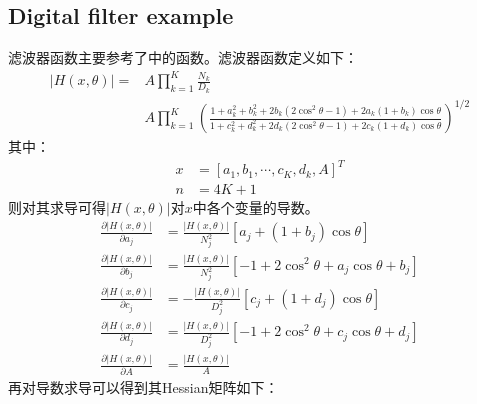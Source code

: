 \documentclass{ctexart}
\begin{document}
\subsection{Digital filter example}
滤波器函数主要参考了\cite{Charalambous1974Minimax}中的函数。滤波器函数定义如下：
$$\begin{aligned}
|H(x,\theta)|=&A\prod_{k=1}^{K}{\frac{N_k}{D_k}}\\
		&A\prod_{k=1}^{K}{(\frac{1+a_k^2+b_k^2+2b_k(2\cos^2\theta-1)+2a_k(1+b_k)\cos\theta}{1+c_k^2+d_k^2+2d_k(2\cos^2\theta-1)+2c_k(1+d_k)\cos\theta})^{1/2}}
\end{aligned}$$
其中：
$$\begin{aligned}
	x&=[a_1,b_1,\cdots,c_K,d_k,A]^T\\
	n&=4K+1
\end{aligned}$$
则对其求导可得$|H(x,\theta)|$对$x$中各个变量的导数。
$$\begin{aligned}
	\frac{\partial{|H(x,\theta)|}}{\partial{a_j}}&=\frac{|H(x,\theta)|}{N_j^2}[a_j+(1+b_j)\cos\theta]\\
	\frac{\partial{|H(x,\theta)|}}{\partial{b_j}}&=\frac{|H(x,\theta)|}{N_j^2}[-1+2\cos^2\theta+a_j\cos\theta+b_j]\\
	\frac{\partial{|H(x,\theta)|}}{\partial{c_j}}&=-\frac{|H(x,\theta)|}{D_j^2}[c_j+(1+d_j)\cos\theta]\\
	\frac{\partial{|H(x,\theta)|}}{\partial{d_j}}&=\frac{|H(x,\theta)|}{D_j^2}[-1+2\cos^2\theta+c_j\cos\theta+d_j]\\
	\frac{\partial{|H(x,\theta)|}}{\partial{A}}&=\frac{|H(x,\theta)|}{A}
\end{aligned}$$
再对导数求导可以得到其Hessian矩阵如下：
\end{document}
